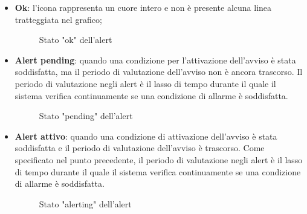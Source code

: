 \begin{itemize}
    \item \textbf{Ok}: l'icona rappresenta un cuore intero e non è presente alcuna linea tratteggiata nel grafico;
    \begin{figure}[H]
        \centering
        \caption{Stato "ok" dell'alert}
        \label{fig:my_label}
    \end{figure}
    \item \textbf{Alert pending}: 
    quando una condizione per l'attivazione dell'avviso è stata soddisfatta, ma il periodo di valutazione dell'avviso non è ancora trascorso. Il periodo di valutazione negli alert è il lasso di tempo durante il quale il sistema verifica continuamente se una condizione di allarme è soddisfatta. 
    \begin{figure}[H]
        \centering
        \caption{Stato "pending" dell'alert}
        \label{fig:my_label}
    \end{figure}
    \item \textbf{Alert attivo}: quando una condizione di attivazione dell'avviso è stata soddisfatta e il periodo di valutazione dell'avviso è trascorso. Come specificato nel punto precedente, il periodo di valutazione negli alert è il lasso di tempo durante il quale il sistema verifica continuamente se una condizione di allarme è soddisfatta.
    \begin{figure}[H]
        \centering
        \caption{Stato "alerting" dell'alert}
        \label{fig:my_label}
    \end{figure}
\end{itemize}

